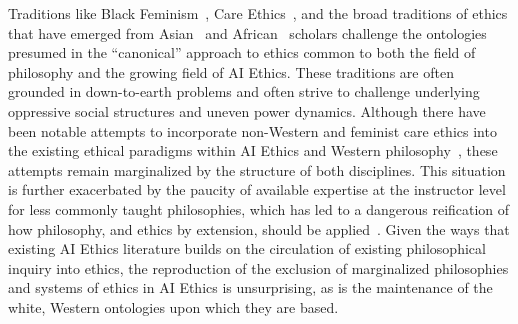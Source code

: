 \documentclass[manuscript]{acmart}
\begin{document}
Traditions like Black Feminism~\cite{h1984feminist,collins2002black}, Care Ethics~\cite{noddinge2013caring}, and the broad traditions of ethics that have emerged from Asian~\cite{li1994,ameshall2003} and African~\cite{mbiti1969african,fromrationality2020,tamale2020decolonization} scholars challenge the ontologies presumed in the ``canonical'' approach to ethics common to both the field of philosophy and the growing field of AI Ethics. These traditions are often grounded in down-to-earth problems and often strive to challenge underlying oppressive social structures and uneven power dynamics. 
Although there have been notable attempts to incorporate non-Western and feminist care ethics into the existing ethical paradigms within AI Ethics and Western philosophy~\cite{vallor2016,mohamed2020decolonial}, these attempts remain marginalized by the structure of both disciplines. This situation is further exacerbated by the paucity of available expertise at the instructor level for less commonly taught philosophies, which has led to a dangerous reification of how philosophy, and ethics by extension, should be applied~\cite{v2017taking}. Given the ways that existing AI Ethics literature builds on the circulation of existing philosophical inquiry into ethics, the reproduction of the exclusion of marginalized philosophies and systems of ethics in AI Ethics is unsurprising, as is the maintenance of the white, Western ontologies upon which they are based.
\end{document}

